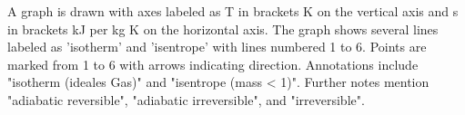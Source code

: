 A graph is drawn with axes labeled as T in brackets K on the vertical axis and s in brackets kJ per kg K on the horizontal axis. The graph shows several lines labeled as 'isotherm' and 'isentrope' with lines numbered 1 to 6. Points are marked from 1 to 6 with arrows indicating direction. Annotations include "isotherm (ideales Gas)" and "isentrope (mass < 1)". Further notes mention "adiabatic reversible", "adiabatic irreversible", and "irreversible".